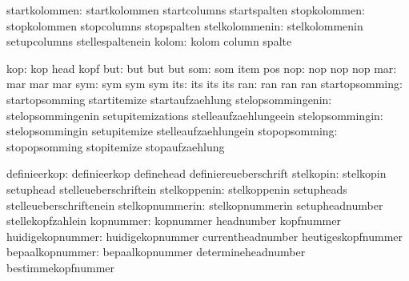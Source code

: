                 startkolommen:  startkolommen                startcolumns
                                startspalten
                 stopkolommen:  stopkolommen                 stopcolumns
                                stopspalten
               stelkolommenin:  stelkolommenin               setupcolumns
                                stellespaltenein
                        kolom:  kolom                        column
                                spalte

                          kop:  kop                          head
                                kopf
                          but:  but                          but
                                but
                          som:  som                          item
                                pos
                          nop:  nop                          nop
                                nop
                          mar:  mar                          mar
                                mar
                          sym:  sym                          sym
                                sym
                          its:  its                          its
                                its
                          ran:  ran                          ran
                                ran
               startopsomming:  startopsomming               startitemize
                                startaufzaehlung
            stelopsommingenin:  stelopsommingenin            setupitemizations
                                stelleaufzaehlungeein %
              stelopsommingin:  stelopsommingin              setupitemize
                                stelleaufzaehlungein
                stopopsomming:  stopopsomming                stopitemize
                                stopaufzaehlung

                 definieerkop:  definieerkop                 definehead
                                definiereueberschrift
                    stelkopin:  stelkopin                    setuphead
                                stelleueberschriftein
                 stelkoppenin:  stelkoppenin                 setupheads
                                stelleueberschriftenein
              stelkopnummerin:  stelkopnummerin              setupheadnumber
                                stellekopfzahlein
                    kopnummer:  kopnummer                    headnumber
                                kopfnummer
             huidigekopnummer:  huidigekopnummer             currentheadnumber
                                heutigeskopfnummer %
              bepaalkopnummer:  bepaalkopnummer              determineheadnumber
                                bestimmekopfnummer %

